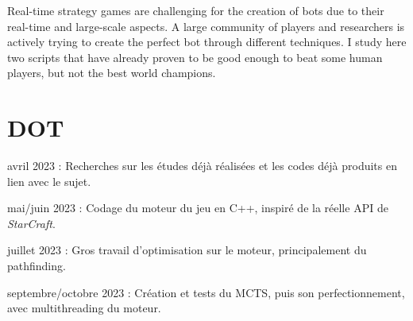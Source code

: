 \documentclass[a4paper, 11pt]{article}
\begin{document}
\begin{comment}
    \section*{Intro}
    
    J'étudie un modèle de joueur artificiel de jeu de stratégie en temps réel (aussi appelé RTS).
    Nous étudions ici des RTS typé \emph{StarCraft}, avec un relativement grand espace de jeu et un relativement grand nombre d'unités.
    J'ai décidé de travailler principalement sur l'application du Monte Carlo Tree Search (MCTS) au problème.
    Le MCTS est souvent utilisé dans des jeux au tour par tour, par exemple le GO ou les échec.
\end{comment}

Real-time strategy games are challenging for the creation of bots due to their real-time and large-scale aspects.
A large community of players and researchers is actively trying to create the perfect bot through different techniques.
I study here two scripts that have already proven to be good enough to beat some human players, but not the best world champions.

\section*{DOT}
\begin{enumerate}[{[1]}]
    \item avril 2023 : Recherches sur les études déjà réalisées et les codes déjà produits en lien avec le sujet.
    \item mai/juin 2023 : Codage du moteur du jeu en C++, inspiré de la réelle API de \emph{StarCraft}.
    \item juillet 2023 : Gros travail d'optimisation sur le moteur, principalement du pathfinding.
    \item septembre/octobre 2023 : Création et tests du MCTS, puis son perfectionnement, avec multithreading du moteur.
\end{enumerate}
\end{document}

